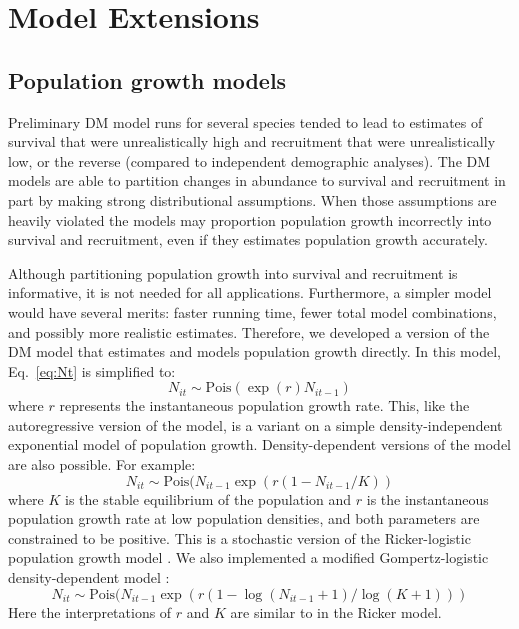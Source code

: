 \documentclass[12pt]{article}
\begin{document}
\section{Model Extensions}
\label{sec:ext}

\subsection{Population growth models}

Preliminary DM model runs for several species tended to lead to
estimates of survival that were unrealistically high and recruitment
that were unrealistically low, or the reverse (compared to independent
demographic analyses).  The DM models are able to partition changes in
abundance to survival and recruitment in part by making strong
distributional assumptions. %
When those assumptions are heavily violated the models may proportion
population growth incorrectly into survival and recruitment, even if
they estimates population growth accurately.

Although partitioning population growth into survival and recruitment
is informative, it is not needed for all applications.  Furthermore, a
simpler model would have several merits: faster running time, fewer
total model combinations, and possibly more realistic estimates.
Therefore, we developed a version of the DM model that estimates and
models population growth directly.  In this model, Eq.~\ref{eq:Nt} is
simplified to:
\begin{equation}
  N_{it} \sim \text{Pois}(\exp(r)N_{it-1})
\label{eq:exp}
\end{equation}
where $r$ represents the instantaneous population growth rate.  This,
like the autoregressive version of the model, is a variant on a simple
density-independent exponential model of population growth.
Density-dependent versions of the model are also possible.  For
example:
\begin{equation}
  N_{it} \sim \text{Pois}(N_{it-1}\exp(r(1-N_{it-1}/K))
\label{eq:rick}
\end{equation}
where $K$ is the stable equilibrium of the population and $r$ is the
instantaneous population growth rate at low population densities, and
both parameters are constrained to be positive.  This is a stochastic version
of the Ricker-logistic population growth model \citep{ricker:1954}.  We also
implemented a modified Gompertz-logistic density-dependent
model \citep{hart_gotelli:2011}:
\begin{equation}
  N_{it} \sim \text{Pois}(N_{it-1}\exp(r(1-\log(N_{it-1}+1)/\log(K+1)))
\label{eq:gomp}
\end{equation}
Here the interpretations of $r$ and $K$ are similar to in the Ricker model.
\end{document}
